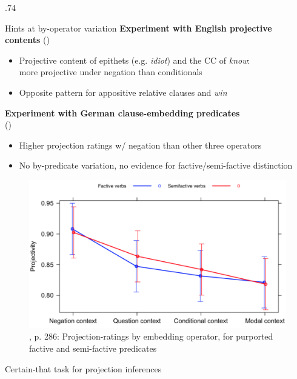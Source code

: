\documentclass[final, table]{beamer}
\newlength{\colwidth}
\newlength{\vboxsep}
\begin{document}
\begin{frame}[t]
\begin{columns}[t]
\begin{column}{.74\colwidth}
\begin{normalbox}{Hints at by-operator variation}
				\textbf{Experiment with English projective contents} (\citealt{smith_relationship_2014})
				\vspace{-.2\baselineskip}
				\begin{itemize}
					\item Projective content of epithets (e.g. \textit{idiot}) and the CC of \textit{know}:\\ more projective under negation than conditionals
					\item Opposite pattern for appositive relative clauses and \textit{win}
				\end{itemize}

				\textbf{Experiment with German clause-embedding predicates}\\ (\citealt{sieker_projective_2022})
				\vspace{-.2\baselineskip}
				\begin{itemize}
					\item Higher projection ratings w/ negation than other three operators
					\item No by-predicate variation, no evidence for factive/semi-factive distinction
				\end{itemize}

				\begin{figure}[h]
					\vspace{-.2\baselineskip}
					\centering
					\includegraphics[width=.7\linewidth]{sieker-solstad.png}
					\vspace{-.4\baselineskip}
					\caption{\citealt{sieker_projective_2022}, p. 286: Projection-ratings by embedding operator, for purported factive and semi-factive predicates}
				\end{figure}
				\vspace{-.8\baselineskip}
			\end{normalbox}

			\vspace{\vboxsep}
			\begin{normalbox}{Certain-that task for projection inferences}


\end{normalbox}
\end{column}
\end{columns}
\end{frame}
\end{document}
